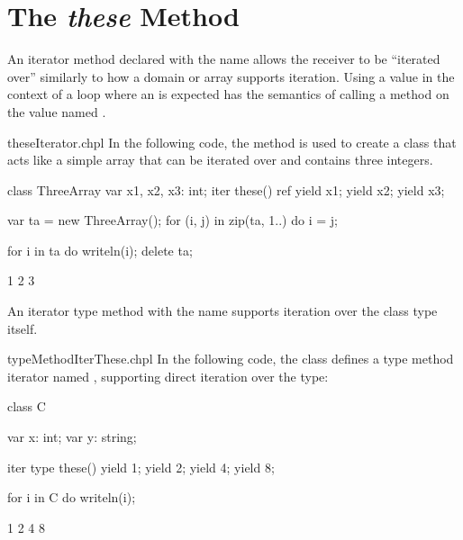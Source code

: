 \section{The {\em these} Method}
\label{The_these_Method}

An iterator method declared with the name  allows the
receiver to be ``iterated over'' similarly to how a domain or array
supports iteration.  Using a value in the context of a loop where an
 is expected has the semantics of calling a
method on the value named .

\begin{chapelexample}{theseIterator.chpl}
In the following code, the  method is used to create a
class that acts like a simple array that can be iterated over and
contains three integers.
\begin{chapel}
class ThreeArray {
  var x1, x2, x3: int;
  iter these() ref {
    yield x1;
    yield x2;
    yield x3;
  }
}
\end{chapel}
\begin{chapelpost}
var ta = new ThreeArray();
for (i, j) in zip(ta, 1..) do
  i = j;

for i in ta do
  writeln(i);
delete ta;
\end{chapelpost}
\begin{chapeloutput}
1
2
3
\end{chapeloutput}

\end{chapelexample}

An iterator type method with the name  supports iteration
over the class type itself.

\begin{chapelexample}{typeMethodIterThese.chpl}
In the following code, the class  defines a type method
iterator named , supporting direct iteration over the type:
\begin{chapel}
class C {
  var x: int;
  var y: string;

  iter type these() {
    yield 1;
    yield 2;
    yield 4;
    yield 8;
  }
}

for i in C do
  writeln(i);
\end{chapel}
\begin{chapeloutput}
1
2
4
8
\end{chapeloutput}
\end{chapelexample}
